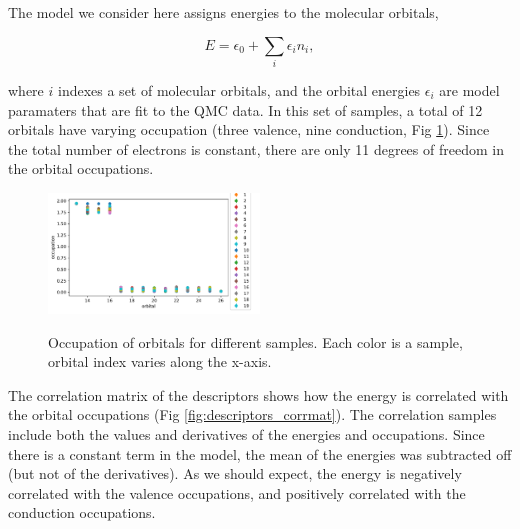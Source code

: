 The model we consider here assigns energies to the molecular orbitals,

\begin{equation}
E = \epsilon_0 + \sum_i \epsilon_i n_i,
\end{equation}

where $i$ indexes a set of molecular orbitals, and the orbital energies $\epsilon_i$ are model paramaters that are fit to the QMC data.
In this set of samples, a total of 12 orbitals have varying occupation (three valence, nine conduction, Fig \ref{fig:descriptors}).
Since the total number of electrons is constant, there are only 11 degrees of freedom in the orbital occupations.

\begin{figure}[h!]
\includegraphics[width=0.5\textwidth]{images/dmc_lowen_descriptors.pdf}
\label{fig:descriptors}
\caption{Occupation of orbitals for different samples. Each color is a sample, orbital index varies along the x-axis.}
\end{figure}

The correlation matrix of the descriptors shows how the energy is correlated with the orbital occupations (Fig \ref{fig:descriptors_corrmat}).
The correlation samples include both the values and derivatives of the energies and occupations.
Since there is a constant term in the model, the mean of the energies was subtracted off (but not of the derivatives).
As we should expect, the energy is negatively correlated with the valence occupations, and positively correlated with the conduction occupations.

